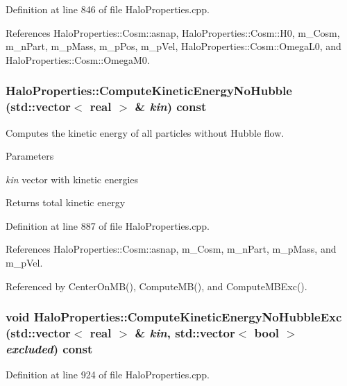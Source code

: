 Definition at line 846 of file HaloProperties.cpp.



References HaloProperties::Cosm::asnap, HaloProperties::Cosm::H0, m\_\-Cosm, m\_\-nPart, m\_\-pMass, m\_\-pPos, m\_\-pVel, HaloProperties::Cosm::OmegaL0, and HaloProperties::Cosm::OmegaM0.

\subsubsection[{ComputeKineticEnergyNoHubble}]{ HaloProperties::ComputeKineticEnergyNoHubble (std::vector$<$ {\bf real} $>$ \& {\em kin}) const}\label{classHaloProperties_ad5bee5f08cc37cc127185acd1ac8bdf3}
Computes the kinetic energy of all particles without Hubble flow. 
\begin{DoxyParams}{Parameters}
\item[{\em kin}]vector with kinetic energies \end{DoxyParams}
\begin{DoxyReturn}{Returns}
total kinetic energy 
\end{DoxyReturn}


Definition at line 887 of file HaloProperties.cpp.



References HaloProperties::Cosm::asnap, m\_\-Cosm, m\_\-nPart, m\_\-pMass, and m\_\-pVel.



Referenced by CenterOnMB(), ComputeMB(), and ComputeMBExc().

\subsubsection[{ComputeKineticEnergyNoHubbleExc}]{\setlength{\rightskip}{0pt plus 5cm}void HaloProperties::ComputeKineticEnergyNoHubbleExc (std::vector$<$ {\bf real} $>$ \& {\em kin}, \/  std::vector$<$ bool $>$ {\em excluded}) const}\label{classHaloProperties_a0d140ad1df53e8ebfaf0bb51c9e54029}


Definition at line 924 of file HaloProperties.cpp.



